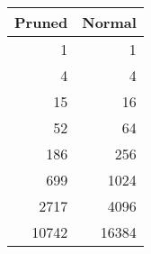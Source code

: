 \documentclass[Pruning.tex]{subfiles}
\begin{document}
\begin{center}
    \begin{tabular}{ | r | r |}
    \hline
    Pruned & Normal  \\ \hline
    1 & 1 \\ \hline
	4 & 4 \\ \hline
	15 & 16 \\ \hline
	52 & 64 \\ \hline
	186 & 256 \\ \hline
	699 & 1024 \\ \hline
	2717 & 4096 \\ \hline
	10742 & 16384 \\
    \hline
    \end{tabular}
\end{center}
\end{document}
